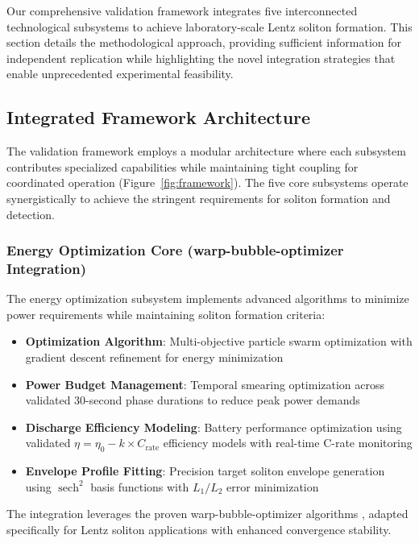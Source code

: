 \documentclass[12pt,a4paper]{article}
\newcommand{\sech}{\operatorname{sech}}
\begin{document}
Our comprehensive validation framework integrates five interconnected technological subsystems to achieve laboratory-scale Lentz soliton formation. This section details the methodological approach, providing sufficient information for independent replication while highlighting the novel integration strategies that enable unprecedented experimental feasibility.

\subsection{Integrated Framework Architecture}

The validation framework employs a modular architecture where each subsystem contributes specialized capabilities while maintaining tight coupling for coordinated operation (Figure~\ref{fig:framework}). The five core subsystems operate synergistically to achieve the stringent requirements for soliton formation and detection.

\subsubsection{Energy Optimization Core (warp-bubble-optimizer Integration)}

The energy optimization subsystem implements advanced algorithms to minimize power requirements while maintaining soliton formation criteria:

\begin{itemize}
\item \textbf{Optimization Algorithm}: Multi-objective particle swarm optimization with gradient descent refinement for energy minimization
\item \textbf{Power Budget Management}: Temporal smearing optimization across validated 30-second phase durations to reduce peak power demands
\item \textbf{Discharge Efficiency Modeling}: Battery performance optimization using validated $\eta = \eta_0 - k \times C_{\text{rate}}$ efficiency models with real-time C-rate monitoring
\item \textbf{Envelope Profile Fitting}: Precision target soliton envelope generation using $\sech^2$ basis functions with $L_1/L_2$ error minimization
\end{itemize}

The integration leverages the proven warp-bubble-optimizer algorithms \cite{WarpBubble2024}, adapted specifically for Lentz soliton applications with enhanced convergence stability.
\end{document}
